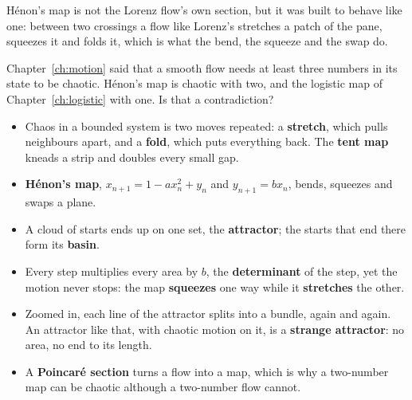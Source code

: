 
\noindent
Hénon's map is not the Lorenz flow's own section, but it was built to behave
like one: between two crossings a flow like Lorenz's stretches a patch of the
pane, squeezes it and folds it, which is what the bend, the squeeze and the
swap do.

\begin{think}
Chapter~\ref{ch:motion} said that a smooth flow needs at least three numbers
in its state to be chaotic. Hénon's map is chaotic with two, and the logistic
map of Chapter~\ref{ch:logistic} with one. Is that a contradiction?
\end{think}

\begin{summarybox}
\begin{itemize}
\item Chaos in a bounded system is two moves repeated: a \textbf{stretch},
  which pulls neighbours apart, and a \textbf{fold}, which puts everything back.
  The \textbf{tent map} kneads a strip and doubles every small gap.
\item \textbf{Hénon's map}, $x_{n+1} = 1 - a x_n^{2} + y_n$ and
  $y_{n+1} = b x_n$, bends, squeezes and swaps a plane.
\item A cloud of starts ends up on one set, the \textbf{attractor}; the starts
  that end there form its \textbf{basin}.
\item Every step multiplies every area by $b$, the \textbf{determinant} of the
  step, yet the motion never stops: the map \textbf{squeezes} one way while it
  \textbf{stretches} the other.
\item Zoomed in, each line of the attractor splits into a bundle, again and
  again. An attractor like that, with chaotic motion on it, is a
  \textbf{strange attractor}: no area, no end to its length.
\item A \textbf{Poincaré section} turns a flow into a map, which is why a
  two-number map can be chaotic although a two-number flow cannot.
\end{itemize}
\end{summarybox}

